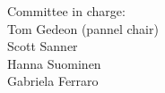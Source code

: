 \noindent
{\Huge{Committee in charge:} }\\[.4cm]
{\LARGE  Tom Gedeon (pannel chair) } \\[.1cm]
{\LARGE  Scott Sanner } \\[.1cm]
{\LARGE  Hanna Suominen } \\[.1cm]
{\LARGE  Gabriela Ferraro } \\[.1cm]



\newpage
%
%
%

